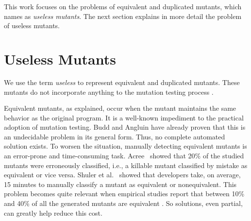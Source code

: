 This work focuses on the problems of equivalent and duplicated mutants, which \cite{PAPADAKIS:2015:1} names as \textit{useless mutants}. 
The next section explains in more detail the problem of useless mutants.

\section{Useless Mutants}
\label{sec:useless_mutants}
We use the term \textit{useless} to represent equivalent and duplicated mutants. 
These mutants do not incorporate anything to the mutation testing process \cite{PAPADAKIS:2015:1}. 

Equivalent mutants, as explained, occur when the mutant maintains the same behavior as the original program. 
It is a well-known impediment to the practical adoption of mutation testing. 
Budd and Angluin \cite{BUDD:1982:1} have already proven that this is an undecidable problem in its general form. 
Thus, no complete automated solution exists. 
To worsen the situation, manually detecting equivalent mutants is an error-prone and time-consuming task. 
Acree~\cite{ACREE:1980:1} showed that 20\% of the studied mutants were erroneously classified, i.e., a killable mutant classified by mistake as equivalent or vice versa. 
Shuler et al.~\cite{SHULER:2013:1} showed that developers take, on average, 15 minutes to manually classify a mutant as equivalent or nonequivalent.
This problem becomes quite relevant when empirical studies report that between 10\% and 40\% of all the generated mutants are equivalent \cite{OFFUTT:1994:1, OFFUT:1997:1}.
So solutions, even partial, can greatly help reduce this cost.


